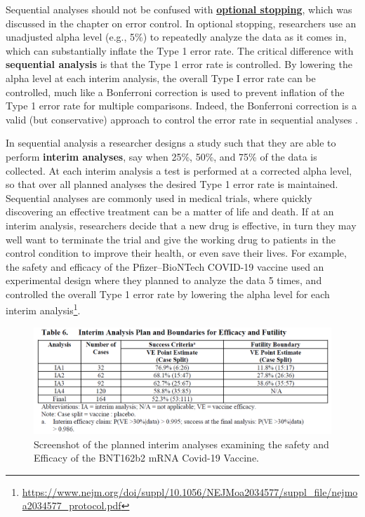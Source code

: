 \documentclass[
  oneside]{krantz}
\renewcommand{\href}[2]{#2\footnote{\url{#1}}}
\begin{document}
Sequential analyses should not be confused with \protect\hyperlink{optionalstopping}{\textbf{optional stopping}}, which was discussed in the chapter on error control. In optional stopping, researchers use an unadjusted alpha level (e.g., 5\%) to repeatedly analyze the data as it comes in, which can substantially inflate the Type 1 error rate. The critical difference with \textbf{sequential analysis} is that the Type 1 error rate is controlled. By lowering the alpha level at each interim analysis, the overall Type I error rate can be controlled, much like a Bonferroni correction is used to prevent inflation of the Type 1 error rate for multiple comparisons. Indeed, the Bonferroni correction is a valid (but conservative) approach to control the error rate in sequential analyses \citep{wassmer_group_2016}.

In sequential analysis a researcher designs a study such that they are able to perform \textbf{interim analyses}, say when 25\%, 50\%, and 75\% of the data is collected. At each interim analysis a test is performed at a corrected alpha level, so that over all planned analyses the desired Type 1 error rate is maintained. Sequential analyses are commonly used in medical trials, where quickly discovering an effective treatment can be a matter of life and death. If at an interim analysis, researchers decide that a new drug is effective, in turn they may well want to terminate the trial and give the working drug to patients in the control condition to improve their health, or even save their lives. For example, the safety and efficacy of the Pfizer--BioNTech COVID-19 vaccine used an experimental design where they planned to analyze the data 5 times, and controlled the overall Type 1 error rate by lowering the alpha level for each \href{https://www.nejm.org/doi/suppl/10.1056/NEJMoa2034577/suppl_file/nejmoa2034577_protocol.pdf}{interim analysis}.

\begin{figure}

{\centering \includegraphics[width=1\linewidth]{images/vaccinetrial} 

}

\caption{Screenshot of the planned interim analyses examining the safety and Efficacy of the BNT162b2 mRNA Covid-19 Vaccine.}\label{fig:interim}
\end{figure}
\end{document}

